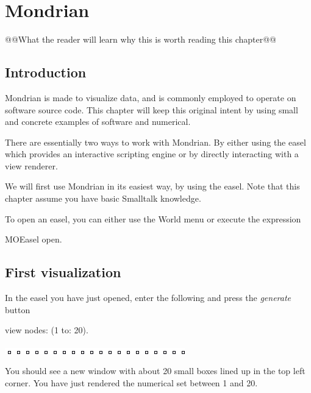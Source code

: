 \documentclass[a4paper,10pt,twoside]{book}
\begin{document}
\fi
\sloppy
\chapter{Mondrian}

@@What the reader will learn why this is worth reading this chapter@@

\section{Introduction}
Mondrian is made to visualize data, and is commonly employed to operate on software source code. This chapter will keep this original intent by using small and concrete examples of software and numerical.

There are essentially two ways to work with Mondrian. By either using the easel which provides an interactive scripting engine or by directly interacting with a view renderer. 

We will first use Mondrian in its easiest way, by using the easel. Note that this chapter assume you have basic Smalltalk knowledge.

To open an easel, you can either use the World menu or execute the expression

\begin{code}{}
MOEasel open.
\end{code}

\section{First visualization}
In the easel you have just opened, enter the following and press the \emph{generate} button

\begin{code}{}
view nodes: (1 to: 20).
\end{code}
\begin{center}\includegraphics[scale=0.4]{picture1}\end{center}


You should see a new window with about 20 small boxes lined up in the top left corner. You have just rendered the numerical set between 1 and 20.
\end{document}
